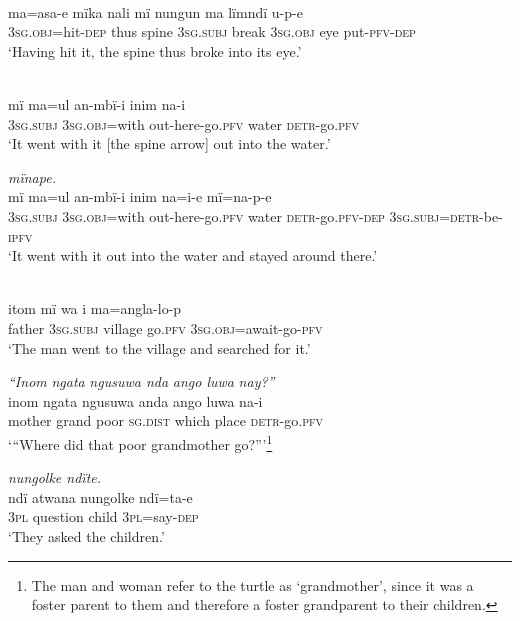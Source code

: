 \ex {}\\
\gll ma=asa-e      m{ï}ka  nali  mï      nungun  ma      lïmndï {u-p-e}\\
3\textsc{sg.obj}=hit-\textsc{dep}  thus  spine  3\textsc{sg.subj}  break    3\textsc{sg.obj}  eye put-\textsc{pfv-dep}\\
\glt ‘Having hit it, the spine thus broke into its eye.’

\ex {}\\
\gll m{ï} m{a=u}l      an{{}-}mbï-{i} inim  {na-i}\\
3\textsc{sg.subj}  \textsc{3sg.obj}=with  out-here-go.\textsc{pfv}  water  \textsc{detr-}go.\textsc{pfv}\\
\glt ‘It went with it [the spine arrow] out into the water.’

\ex {} {\textit{mïnape.}}\\
\gll m{ï} m{a=u}l      an{{}-}mbï-{i} inim  na{=i-e} {mï=na-p-e}\\
3\textsc{sg.subj}  \textsc{3sg.obj}=with  out-here-go.\textsc{pfv}  water  \textsc{detr-}go.\textsc{pfv-dep} \textsc{3sg.subj=detr-}be-\textsc{ipfv}\\
\glt ‘It went with it out into the water and stayed around there.’

\newpage

\ex {}\\
\gll itom  mï      wa    i ma={a}ngla{{}-}lo-p\\
father  3\textsc{sg.subj}  village  go.\textsc{pfv}  3\textsc{sg.obj}=await-go-\textsc{pfv}\\
\glt ‘The man went to the village and searched for it.’

\ex \negmedspace \textit{“Inom} {\textit{ngata}} \textit{ngusuwa nda} {\textit{a}}\textit{ng}{\textit{o luwa}} \textit{nay?”}\\
\gll inom  {ngata} ngusuwa  {a}nda    {a}ngo  luwa na{{}-i}\\
mother  grand  poor    \textsc{sg.dist}  which  place  \textsc{detr-}go.\textsc{pfv}\\
\glt ‘“Where did that poor grandmother go?”’\footnote{The man and woman refer to the turtle as ‘grandmother’, since it was a foster parent to them and therefore a foster grandparent to their children.}

\ex {} \textit{nungolke ndïte.}\\
\gll ndï  atwana nungolke  ndï{=}ta-e\\
3\textsc{pl}  question  child    3\textsc{pl}=say-\textsc{dep}\\
\glt ‘They asked the children.’

